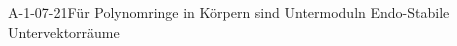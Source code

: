 
\begin{EXA}{A-1-07-21}{Für Polynomringe in Körpern sind Untermoduln Endo-Stabile Untervektorräume}
\end{EXA}
